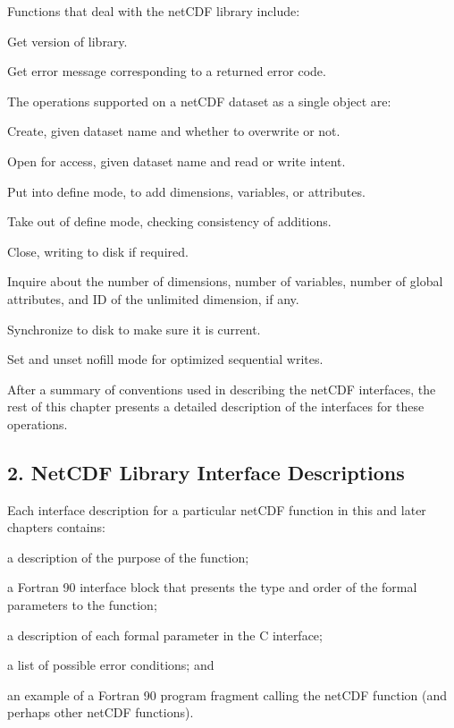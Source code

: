 Functions that deal with the net\+C\+DF library include\+:


\begin{DoxyItemize}
\item Get version of library.
\item Get error message corresponding to a returned error code.
\end{DoxyItemize}

The operations supported on a net\+C\+DF dataset as a single object are\+:


\begin{DoxyItemize}
\item Create, given dataset name and whether to overwrite or not.
\item Open for access, given dataset name and read or write intent.
\item Put into define mode, to add dimensions, variables, or attributes.
\item Take out of define mode, checking consistency of additions.
\item Close, writing to disk if required.
\item Inquire about the number of dimensions, number of variables, number of global attributes, and ID of the unlimited dimension, if any.
\item Synchronize to disk to make sure it is current.
\item Set and unset nofill mode for optimized sequential writes.
\item After a summary of conventions used in describing the net\+C\+DF interfaces, the rest of this chapter presents a detailed description of the interfaces for these operations.
\end{DoxyItemize}\hypertarget{f90_datasets_f90-netcdf-library-interface-descriptions}{}\subsection{2. Net\+C\+D\+F Library Interface Descriptions }\label{f90_datasets_f90-netcdf-library-interface-descriptions}
Each interface description for a particular net\+C\+DF function in this and later chapters contains\+:


\begin{DoxyItemize}
\item a description of the purpose of the function;
\item a Fortran 90 interface block that presents the type and order of the formal parameters to the function;
\item a description of each formal parameter in the C interface;
\item a list of possible error conditions; and
\item an example of a Fortran 90 program fragment calling the net\+C\+DF function (and perhaps other net\+C\+DF functions).
\end{DoxyItemize}


